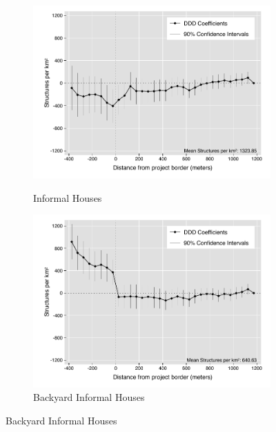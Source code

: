 \documentclass[12pt]{article}
\begin{document}
\begin{figure}[t!]
\begin{subfigure}[b]{0.49\textwidth}
        \label{fig:DDDformal}
    \end{subfigure}
    \vskip 1mm \vskip 0pt
    \begin{subfigure}[b]{0.49\textwidth}
        \centering
        \caption[]{\small Informal Houses}
        \vspace{-1mm}
        \includegraphics[width=\textwidth,trim={.5cm .3cm .3cm 0cm}, clip=true]{figures/distplotDDD_bblu_inf_admin_5.pdf}
        \label{fig:DDDinformal}
    \end{subfigure}
    \hfill
    \begin{subfigure}[b]{0.49\textwidth}  
        \centering
        \caption[]{\small Backyard Informal Houses}  
        \vspace{-1mm}
        \includegraphics[width=\textwidth,trim={.5cm .3cm .3cm 0cm}, clip=true]{figures/distplotDDD_bblu_inf_backyard_admin_5.pdf}

\end{subfigure}
\end{figure}
\end{document}
